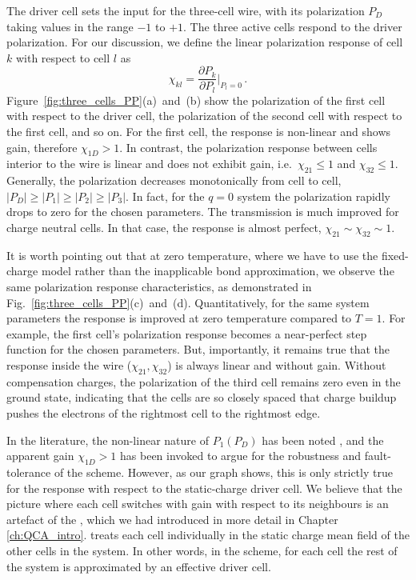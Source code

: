 The driver cell sets the input for the three-cell wire, with its
polarization $P_D$ taking values in the range $-1$ to $+1$. The three active
cells respond to the driver polarization. For our discussion, we define the
linear polarization response of cell $k$ with respect to cell $l$ as
%
\begin{equation}
  \label{eq:polarization_response}
  \chi_{kl} = \frac{\partial P_k}{\partial P_l}\big|_{P_l = 0} \, .
\end{equation}
%
Figure~\ref{fig:three_cells_PP}(a)~and~(b) show the polarization of the first cell
with respect to the driver cell, the polarization of the second cell with
respect to the first cell, and so on. For the first cell, the response is
non-linear and shows gain, therefore $\chi_{1D} > 1$. In contrast, the
polarization response between cells interior to the wire is linear and does not
exhibit gain, i.e.~$\chi_{21} \le 1$ and $\chi_{32} \le 1$. Generally, the
polarization decreases monotonically from cell to cell, $|P_D| \ge |P_1| \ge
|P_2| \ge |P_3|$. In fact, for the $q=0$ system the polarization rapidly drops
to zero for the chosen parameters. The transmission is much improved for charge
neutral cells. In that case, the response is almost perfect, $\chi_{21} \sim
\chi_{32} \sim 1$.

It is worth pointing out that at zero temperature, where we have to use the
fixed-charge model rather than the inapplicable bond approximation, we observe
the same polarization response characteristics, as demonstrated in
Fig.~\ref{fig:three_cells_PP}(c)~and~(d). Quantitatively, for the same system
parameters the response is improved at zero temperature compared to $T=1$. For
example, the first cell's polarization response becomes a near-perfect step
function for the chosen parameters. But, importantly, it remains true that the
response inside the wire ($\chi_{21}, \chi_{32}$) is always linear and without
gain. Without compensation charges, the polarization of the third cell remains
zero even in the ground state, indicating that the cells are so closely spaced
that charge buildup pushes the electrons of the rightmost cell to the rightmost
edge.

In the literature, the non-linear nature of $P_1(P_D)$ has been noted
\cite{lent1993quantum, lent1993lines}, and the apparent gain $\chi_{1D} >
1$ has been invoked to argue for the robustness and fault-tolerance of the
 scheme. However, as our graph shows, this is only strictly true for
the response with respect to the static-charge driver cell. We believe that the
picture where each cell switches with gain with respect to its neighbours is an
artefact of the , which we had introduced in more detail in Chapter
\ref{ch:QCA_intro}.  treats each cell individually in the static
charge mean field of the other cells in the system. In other words, in the
 scheme, for each cell the rest of the system is approximated by an
effective driver cell.

